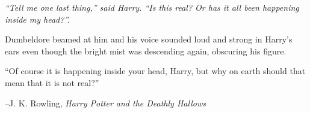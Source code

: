 \documentclass{exam}
\begin{document}
\else

\vspace{2 in}

{\em 
``Tell me one last thing,'' said Harry.  ``Is this real?  Or has it all been happening inside my head?''.  

Dumbeldore beamed at him and his voice sounded loud and strong in Harry's ears even though the bright mist was
descending again, obscuring his figure.

``Of course it is happening inside your head, Harry, but why on earth should that mean that it is not real?''
}

\vspace{.2 cm}

\hspace{1 cm} --J. K. Rowling, {\em Harry Potter and the Deathly Hallows}
\fi
\end{document}
